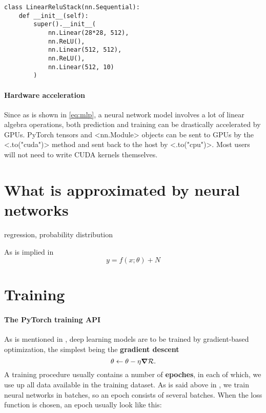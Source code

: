 \documentclass[hyperref, a4paper, 12pt]{report}
\newcommand*{\concept}[1]{{\textbf{#1}}}
\def\texttt#1{<#1>}%
\newcommand{\shortcode}[1]{\texttt{#1}}
\begin{document}
\begin{lstlisting}
class LinearReluStack(nn.Sequential):
    def __init__(self):
        super().__init__(
            nn.Linear(28*28, 512),
            nn.ReLU(),
            nn.Linear(512, 512),
            nn.ReLU(),
            nn.Linear(512, 10)
        )
\end{lstlisting}

\paragraph*{Hardware acceleration}
Since as is shown in \eqref{eq:mlp}, a neural network model involves a lot of linear algebra operations,
both prediction and training can be drastically accelerated by GPUs.
PyTorch tensors and \shortcode{nn.Module} objects can be sent to GPUs
by the \shortcode{.to("cuda")} method and sent back to the host by \shortcode{.to("cpu")}.
Most users will not need to write CUDA kernels themselves.

\section{What is approximated by neural networks}

regression, probability distribution

As is implied in 
\begin{equation}
    y = f(x; \theta) + N
\end{equation}

\section{Training}

\paragraph*{The PyTorch training API}
As is mentioned in , deep learning models are to be trained by gradient-based optimization,
the simplest being the \concept{gradient descent}
\begin{equation}
    \theta \leftarrow \theta - \eta \grad \mathcal{R}.
\end{equation}
A training procedure usually contains a number of \concept{epoches},
in each of which, we use up all data available in the training dataset.
As is said above in , 
we train neural networks in batches, so an epoch consists of several batches.
When the loss function is chosen, 
an epoch usually look like this:
\end{document}
